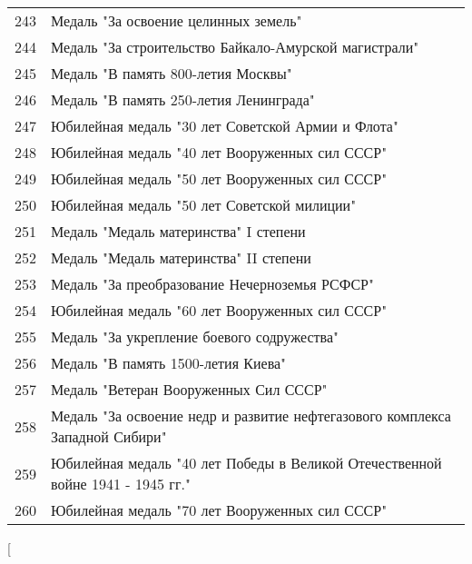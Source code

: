 \documentclass[10pt, a4paper, titlepage]{article}
\begin{document}
\begin{center}
\begin{longtable}{rp{}}
        243 & Медаль "За освоение целинных земель" \\
        244 & Медаль "За строительство Байкало-Амурской магистрали" \\
        245 & Медаль "В память 800-летия Москвы" \\
        246 & Медаль "В память 250-летия Ленинграда" \\
        247 & Юбилейная медаль "30 лет Советской Армии и Флота" \\
        248 & Юбилейная медаль "40 лет Вооруженных сил СССР" \\
        249 & Юбилейная медаль "50 лет Вооруженных сил СССР" \\
        250 & Юбилейная медаль "50 лет Советской милиции" \\
        251 & Медаль "Медаль материнства" I степени \\
        252 & Медаль "Медаль материнства" II степени \\
        253 & Медаль "За преобразование Нечерноземья РСФСР" \\
        254 & Юбилейная медаль "60 лет Вооруженных сил СССР" \\
        255 & Медаль "За укрепление боевого содружества" \\
        256 & Медаль "В память 1500-летия Киева" \\
        257 & Медаль "Ветеран Вооруженных Сил СССР" \\
        258 & Медаль "За освоение недр и развитие нефтегазового комплекса Западной Сибири" \\
        259 & Юбилейная медаль "40 лет Победы в Великой Отечественной войне 1941 - 1945 гг." \\
        260 & Юбилейная медаль "70 лет Вооруженных сил СССР" \\
    \end{longtable}
\end{center}


\twocolumn[
\end{document}
